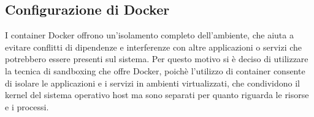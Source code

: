 \subsection{Configurazione di Docker}
I container Docker offrono un'isolamento completo dell'ambiente, che aiuta a evitare conflitti di dipendenze e interferenze con altre applicazioni o servizi che potrebbero essere presenti sul sistema. Per questo motivo si è deciso di utilizzare la tecnica di sandboxing che offre Docker, poichè l'utilizzo di container consente di isolare le applicazioni e i servizi in ambienti virtualizzati, che condividono il kernel del sistema operativo host ma sono separati per quanto riguarda le risorse e i processi.\\

